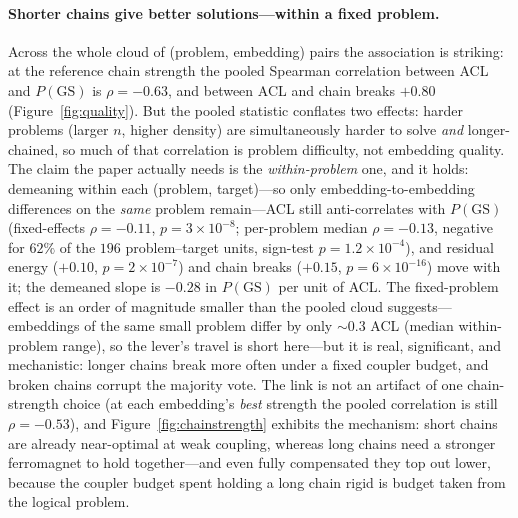 \documentclass[acmsmall,anonymous,nonacm]{acmart}
\begin{document}
\paragraph{Shorter chains give better solutions---within a fixed problem.} Across
the whole cloud of (problem, embedding) pairs the association is striking: at the
reference chain strength the pooled Spearman correlation between ACL and
$P(\mathrm{GS})$ is $\rho=-0.63$, and between ACL and chain breaks $+0.80$
(Figure~\ref{fig:quality}). But the pooled statistic conflates two effects: harder
problems (larger $n$, higher density) are simultaneously harder to solve \emph{and}
longer-chained, so much of that correlation is problem difficulty, not embedding
quality. The claim the paper actually needs is the \emph{within-problem} one, and it
holds: demeaning within each (problem, target)---so only embedding-to-embedding
differences on the \emph{same} problem remain---ACL still anti-correlates with
$P(\mathrm{GS})$ (fixed-effects $\rho=-0.11$, $p=3{\times}10^{-8}$; per-problem
median $\rho=-0.13$, negative for $62\%$ of the $196$ problem--target units,
sign-test $p=1.2{\times}10^{-4}$), and residual energy ($+0.10$,
$p=2{\times}10^{-7}$) and chain breaks ($+0.15$, $p=6{\times}10^{-16}$) move with
it; the demeaned slope is $-0.28$ in $P(\mathrm{GS})$ per unit of ACL. The
fixed-problem effect is an order of magnitude smaller than the pooled cloud
suggests---embeddings of the same small problem differ by only ${\sim}0.3$ ACL
(median within-problem range), so the lever's travel is short here---but it is
real, significant, and mechanistic: longer chains break more often under a fixed
coupler budget, and broken chains corrupt the majority vote. The link is not an
artifact of one chain-strength choice (at each embedding's \emph{best} strength the
pooled correlation is still $\rho=-0.53$), and Figure~\ref{fig:chainstrength}
exhibits the mechanism: short chains are
already near-optimal at weak coupling, whereas long chains need a stronger
ferromagnet to hold together---and even fully compensated they top out lower, because
the coupler budget spent holding a long chain rigid is budget taken from the logical
problem.
\end{document}
